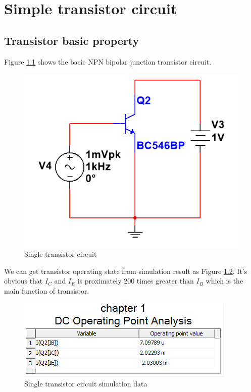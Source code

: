 \chapter{Simple transistor circuit}

\section{Transistor basic property}
Figure \ref{fig:singletransistorcircuit} shows the basic NPN bipolar junction transistor circuit.

\begin{figure}[htbp]
\centering
\includegraphics[scale=0.7]{"../Photo/Chap1/single transistor circuit"}
\caption{Single transistor circuit}
\label{fig:singletransistorcircuit}

\end{figure}

 We can get transistor operating state from simulation result as Figure \ref{fig:single transistor circuit data tablet}. It's obvious that $I_C$ and $I_E$ is proximately 200 times greater than $I_B$ which is the main function of transistor.

 \begin{figure}[htbp]
 	\centering
 	\includegraphics[scale=1]{"../Photo/Chap1/single transistor circuit data table"}
 	\caption{Single transistor circuit simulation data}
 	\label{fig:single transistor circuit data tablet}
 	
 \end{figure}

